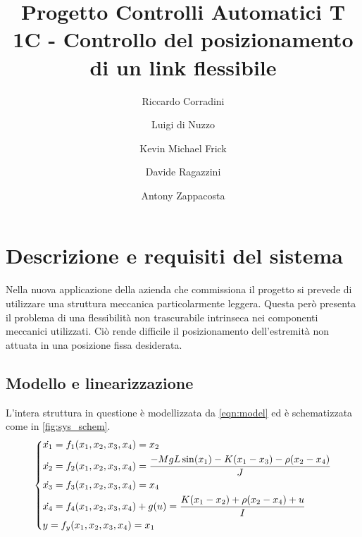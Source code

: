 \documentclass[a4paper]{article}
\title{Progetto Controlli Automatici T \\ 1C - Controllo del posizionamento di un link flessibile}
\author{Riccardo Corradini \and Luigi di Nuzzo \and Kevin Michael Frick \and Davide Ragazzini \and Antony Zappacosta}
\newenvironment{eqsys}{\begin{equation}\begin{dcases}}{\end{dcases}\end{equation}}
\begin{document}
\maketitle
\tableofcontents
\clearpage
\section{Descrizione e requisiti del sistema}
Nella nuova applicazione della azienda che commissiona il progetto si prevede di utilizzare una struttura meccanica particolarmente leggera. 
Questa però presenta il problema di una flessibilità non trascurabile intrinseca nei componenti meccanici utilizzati. 
Ciò rende difficile il posizionamento dell’estremità non attuata in una posizione fissa desiderata.
\subsection{Modello e linearizzazione}
L’intera struttura in questione è modellizzata da \cref{eqn:model} ed è schematizzata come in \cref{fig:sys_schem}.
\begin{eqsys}       
    \label{eqn:model}
    \dot{x_1}  =  f_1 (x_1, x_2, x_3, x_4)  =  x_2 \\
    \dot{x_2}  =  f_2 (x_1, x_2, x_3, x_4)  =  \frac{-M g L \sin (x_1) - K (x_1 - x_3) - \rho (x_2 - x_4)}{J} \\
    \dot{x_3}  =  f_3 (x_1, x_2, x_3, x_4)  =  x_4 \\
    \dot{x_4}  =  f_4 (x_1, x_2, x_3, x_4) + g(u)  =  \frac{K(x_1 - x_2) + \rho (x_2 - x_4) + u}{I}\\
    y  =  f_y (x_1, x_2, x_3, x_4)  =  x_1
\end{eqsys}
\end{document}

